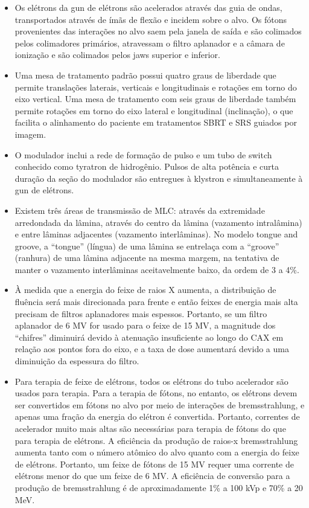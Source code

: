 \documentclass[11pt,a4paper]{article}
\newcounter{exemplo}
\begin{document}
\begin{exemplo}[Física]
\begin{itemize}
        \item Os elétrons da gun de elétrons são acelerados através das guia de ondas, transportados através de ímãs de flexão e incidem sobre o alvo. Os fótons provenientes das interações no alvo saem pela janela de saída e são colimados pelos colimadores primários, atravessam o filtro aplanador e a câmara de ionização e são colimados pelos jaws superior e inferior.
        
        \item Uma mesa de tratamento padrão possui quatro graus de liberdade que permite translações laterais, verticais e longitudinais e rotações em torno do eixo vertical. Uma mesa de tratamento com seis graus de liberdade também permite rotações em torno do eixo lateral e longitudinal (inclinação), o que facilita o alinhamento do paciente em tratamentos SBRT e SRS guiados por imagem.
        
        \item O modulador inclui a rede de formação de pulso e um tubo de switch conhecido como tyratron de hidrogênio. Pulsos de alta potência e curta duração da seção do modulador são entregues à klystron e simultaneamente à gun de elétrons.
        
        \item Existem três áreas de transmissão de MLC: através da extremidade arredondada da lâmina, através do centro da lâmina (vazamento intralâmina) e entre lâminas adjacentes (vazamento interlâminas). No modelo tongue and groove, a “tongue” (língua) de uma lâmina se entrelaça com a “groove” (ranhura) de uma lâmina adjacente na mesma margem, na tentativa de manter o vazamento interlâminas aceitavelmente baixo, da ordem de 3 a 4\%.
        
        \item À medida que a energia do feixe de raios X aumenta, a distribuição de fluência será mais direcionada para frente e então feixes de energia mais alta precisam de filtros aplanadores mais espessos. Portanto, se um filtro aplanador de 6 MV for usado para o feixe de 15 MV, a magnitude dos ``chifres'' diminuirá devido à atenuação insuficiente ao longo do CAX em relação aos pontos fora do eixo, e a taxa de dose aumentará devido a uma diminuição da espessura do filtro.
        
        \item Para terapia de feixe de elétrons, todos os elétrons do tubo acelerador são usados para terapia. Para a terapia de fótons, no entanto, os elétrons devem ser convertidos em fótons no alvo por meio de interações de bremsstrahlung, e apenas uma fração da energia do elétron é convertida. Portanto, correntes de acelerador muito mais altas são necessárias para terapia de fótons do que para terapia de elétrons. A eficiência da produção de raios-x bremsstrahlung aumenta tanto com o número atômico do alvo quanto com a energia do feixe de elétrons. Portanto, um feixe de fótons de 15 MV requer uma corrente de elétrons menor do que um feixe de 6 MV. A eficiência de conversão para a produção de bremsstrahlung é de aproximadamente 1\% a 100 kVp e 70\% a 20 MeV.
        

\end{itemize}
\end{exemplo}
\end{document}
